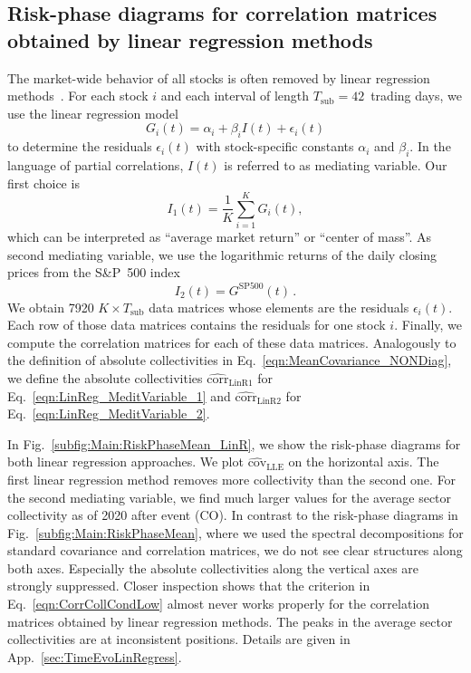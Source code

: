 \documentclass[aps, pra, groupedaddress, showkeys, twocolumn, floatfix, 10pt]{revtex4-2}
\newcommand*\meanNONDiag[1]{\widehat{#1}}
\begin{document}
\subsection{\label{sec:RiskPhaseLinRegress}Risk-phase diagrams for correlation matrices obtained by linear regression methods}

The market-wide behavior of all stocks is often removed by linear regression methods~\cite{Plerou_2002,Borghesi_2007,shapira2009index,kenett2010dominating,Ross_2014,Kenett_2015}.
For each stock $i$ and each interval of length $T_{\text{sub}} = 42$~trading days, we use the linear regression model
%
\begin{equation} \label{eqn:LinReg}
	G_i(t) = \alpha_i + \beta_i I(t) + \epsilon_i(t)
\end{equation}
% 
to determine the residuals $\epsilon_i(t)$ with stock-specific constants $\alpha_i$ and $\beta_i$.
In the language of partial correlations, $I(t)$ is referred to as mediating variable.
Our first choice is
%
\begin{equation} \label{eqn:LinReg_MeditVariable_1}
	I_1(t) = \frac{1}{K} \sum_{i=1}^K G_i(t) ,
\end{equation}
% 
which can be interpreted as ``average market return'' or ``center of mass''.
As second mediating variable, we use
the logarithmic returns of the daily closing prices from the S\&P~500 index
%
\begin{equation} \label{eqn:LinReg_MeditVariable_2}
	I_2(t) = G^{\text{SP500}}(t) \,.
\end{equation}
% 
We obtain 7920 $K\times T_{\text{sub}}$ data matrices whose elements are the residuals $\epsilon_i(t)$.
Each row of those data matrices contains the residuals for one stock $i$. 
Finally, we compute the correlation matrices for each of these data matrices.
Analogously to the definition of absolute collectivities in Eq.~\eqref{eqn:MeanCovariance_NONDiag}, we define
the absolute collectivities $\meanNONDiag{\text{corr}}_{\text{LinR1}}$ for Eq.~\eqref{eqn:LinReg_MeditVariable_1}
and $\meanNONDiag{\text{corr}}_{\text{LinR2}}$ for Eq.~\eqref{eqn:LinReg_MeditVariable_2}.

In Fig.~\ref{subfig:Main:RiskPhaseMean_LinR}, we show the risk-phase diagrams for both linear regression approaches.
We plot $\meanNONDiag{\text{cov}}_{\text{LLE}}$ on the horizontal axis.
The first linear regression method removes more collectivity than the second one.
For the second mediating variable, we find much larger values for the average sector collectivity as of 2020 after event (CO).
In contrast to the risk-phase diagrams in Fig.~\ref{subfig:Main:RiskPhaseMean}, where we used the spectral decompositions for standard covariance and correlation matrices, we do not see clear structures along both axes.
Especially the absolute collectivities along the vertical axes are strongly suppressed.
Closer inspection shows that the criterion in Eq.~\eqref{eqn:CorrCollCondLow} almost never works properly for the correlation matrices obtained
by linear regression methods. The peaks in the average sector collectivities are at inconsistent positions. Details are
given in App.~\ref{sec:TimeEvoLinRegress}. 
\end{document}
